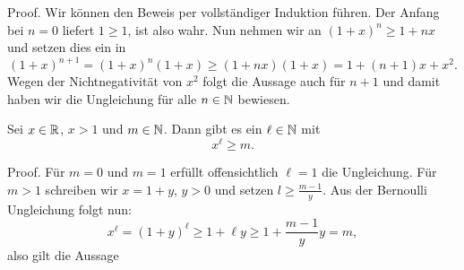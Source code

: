 \begin{emphBox}{}{}
Proof. Wir können den Beweis per vollständiger Induktion führen. Der Anfang bei \(n=0\) liefert \(1 \geq 1\), ist also wahr. Nun nehmen wir an \((1+x)^n \geq 1 + n x\) und setzen dies ein in
\begin{equation*}
 (1+x)^{n+1} = (1+x)^n (1+x) \geq (1+nx)(1+x) = 1+ (n+1)x +x^2.
\end{equation*}
Wegen der Nichtnegativität von \(x^2\) folgt die Aussage auch für \(n+1\) und damit haben wir die Ungleichung für alle \(n\in \mathbb{N}\) bewiesen.
\end{emphBox}
\label{grundlagen/zahlensysteme:lemma-21}
\begin{lemma}{}{}



Sei \(x \in \mathbb{R}\), \(x  > 1\) und \(m\in \mathbb{N}\). Dann gibt es ein \(\ell \in \mathbb{N}\) mit
\begin{equation*}
x^\ell \geq m.
\end{equation*}\end{lemma}

\begin{emphBox}{}{}
Proof.  Für \(m=0\) und \(m=1\) erfüllt offensichtlich \(\ell=1\) die Ungleichung. Für \(m > 1\) schreiben wir \(x=1+y\), \(y > 0\) und setzen \(l \geq \frac{m-1}y\). Aus der Bernoulli Ungleichung folgt nun:
\begin{equation*}
x^\ell =(1+y)^\ell \geq 1+ \ell y \geq 1+  \frac{m-1}y y = m,
\end{equation*}
also gilt die Aussage
\end{emphBox}


